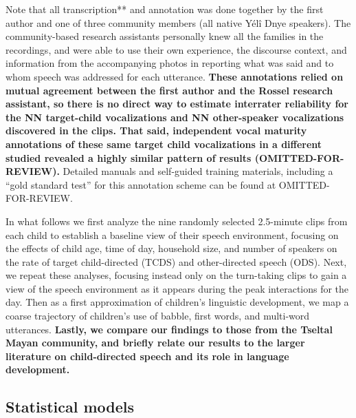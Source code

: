 \documentclass[,man,floatsintext]{apa6}
\begin{document}
Note that all transcription** and annotation was done together by the
first author and one of three community members (all native Yélî Dnye
speakers). The community-based research assistants personally knew all
the families in the recordings, and were able to use their own
experience, the discourse context, and information from the accompanying
photos in reporting what was said and to whom speech was addressed for
each utterance. \textbf{These annotations relied on mutual agreement
between the first author and the Rossel research assistant, so there is
no direct way to estimate interrater reliability for the NN target-child
vocalizations and NN other-speaker vocalizations discovered in the
clips. That said, independent vocal maturity annotations of these same
target child vocalizations in a different studied revealed a highly
similar pattern of results (OMITTED-FOR-REVIEW).} Detailed manuals and
self-guided training materials, including a \enquote{gold standard test}
for this annotation scheme can be found at OMITTED-FOR-REVIEW.

In what follows we first analyze the nine randomly selected 2.5-minute
clips from each child to establish a baseline view of their speech
environment, focusing on the effects of child age, time of day,
household size, and number of speakers on the rate of target
child-directed (TCDS) and other-directed speech (ODS). Next, we repeat
these analyses, focusing instead only on the turn-taking clips to gain a
view of the speech environment as it appears during the peak
interactions for the day. Then as a first approximation of children's
linguistic development, we map a coarse trajectory of children's use of
babble, first words, and multi-word utterances. \textbf{Lastly, we
compare our findings to those from the Tseltal Mayan community, and
briefly relate our results to the larger literature on child-directed
speech and its role in language development.}

\subsection{Statistical models}\label{statistical-models}
\end{document}
